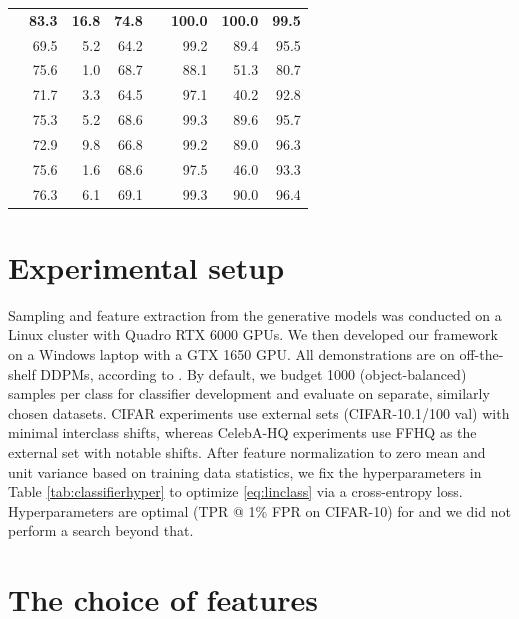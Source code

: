 \documentclass{article}
\theoremstyle{remark}
\begin{document}
\begin{table}[t]
\begin{tabular}{@{}lrrrrrrr@{}}
           & \textbf{83.3} & \textbf{16.8} & \textbf{74.8} && \textbf{100.0} & \textbf{100.0} & \textbf{99.5} \\
           & 69.5 & 5.2 & 64.2 && 99.2 & 89.4 & 95.5 \\
           & 75.6 & 1.0 & 68.7 && 88.1 & 51.3 & 80.7 \\
           & 71.7 & 3.3 & 64.5 && 97.1 & 40.2 & 92.8 \\
           & 75.3 & 5.2 & 68.6 && 99.3 & 89.6 & 95.7 \\
           & 72.9 & 9.8 & 66.8 && 99.2 & 89.0 & 96.3 \\
           & 75.6 & 1.6 & 68.6 && 97.5 & 46.0 & 93.3 \\
           & 76.3 & 6.1 & 69.1 && 99.3 & 90.0 & 96.4 \\
           \bottomrule                              
    \end{tabular}
    \label{tab:ablationmia}
\end{table}

\section{Experimental setup}
\label{appendix:setup}

Sampling and feature extraction from the generative models was conducted on a Linux cluster with Quadro RTX 6000 GPUs. We then developed our framework on a Windows laptop with a GTX 1650 GPU. All demonstrations are on off-the-shelf DDPMs, according to \citet{NEURIPS2020_4c5bcfec}. By default, we budget 1000 (object-balanced) samples per class for classifier development and evaluate on separate, similarly chosen datasets. CIFAR experiments use external sets (CIFAR-10.1/100 val) with minimal interclass shifts, whereas CelebA-HQ experiments use FFHQ as the external set with notable shifts. After feature normalization to zero mean and unit variance based on training data statistics, we fix the hyperparameters in Table \ref{tab:classifierhyper} to optimize \eqref{eq:linclass} via a cross-entropy loss. Hyperparameters are optimal (TPR @ 1\% FPR on CIFAR-10) for \citet{pang2025whitebox} and we did not perform a search beyond that.

\section{The choice of features}
\label{appendix:featureablation}
\end{document}
